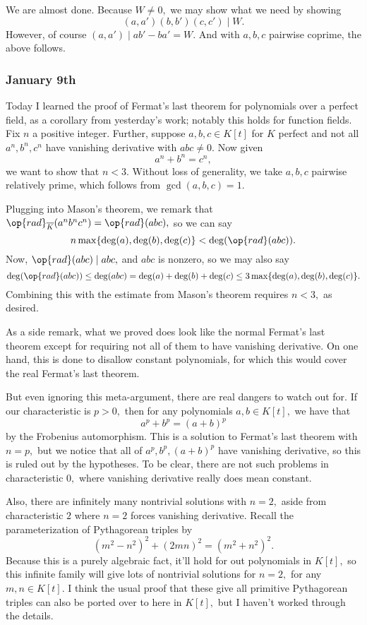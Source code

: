 We are almost done. Because $W\ne0,$ we may show what we need by showing
\[(a,a')(b,b')(c,c')\mid W.\]
However, of course $(a,a')\mid ab'-ba'=W.$ And with $a,b,c$ pairwise coprime, the above follows.

\subsubsection{January 9th}
Today I learned the proof of Fermat's last theorem for polynomials over a perfect field, as a corollary from yesterday's work; notably this holds for function fields. Fix $n$ a positive integer. Further, suppose $a,b,c\in K[t]$ for $K$ perfect and not all $a^n,b^n,c^n$ have vanishing derivative with $abc\ne0.$ Now given
\[a^n+b^n=c^n,\]
we want to show that $n<3.$ Without loss of generality, we take $a,b,c$ pairwise relatively prime, which follows from $\gcd(a,b,c)=1.$

Plugging into Mason's theorem, we remark that $\op{rad}_{\overline K}(a^nb^nc^n)=\op{rad}(abc),$ so we can say
\[n\max\{\deg(a),\deg(b),\deg(c)\}<\deg(\op{rad}(abc)).\]
Now, $\op{rad}(abc)\mid abc,$ and $abc$ is nonzero, so we may also say
\[\deg(\op{rad}(abc))\le\deg(abc)=\deg(a)+\deg(b)+\deg(c)\le3\max\{\deg(a),\deg(b),\deg(c)\}.\]
Combining this with the estimate from Mason's theorem requires $n<3,$ as desired.

As a side remark, what we proved does look like the normal Fermat's last theorem except for requiring not all of them to have vanishing derivative. On one hand, this is done to disallow constant polynomials, for which this would cover the real Fermat's last theorem.

But even ignoring this meta-argument, there are real dangers to watch out for. If our characteristic is $p>0,$ then for any polynomials $a,b\in K[t],$ we have that
\[a^p+b^p=(a+b)^p\]
by the Frobenius automorphism. This is a solution to Fermat's last theorem with $n=p,$ but we notice that all of $a^p,b^p,(a+b)^p$ have vanishing derivative, so this is ruled out by the hypotheses. To be clear, there are not such problems in characteristic $0,$ where vanishing derivative really does mean constant.

Also, there are infinitely many nontrivial solutions with $n=2,$ aside from characteristic $2$ where $n=2$ forces vanishing derivative. Recall the parameterization of Pythagorean triples by
\[\left(m^2-n^2\right)^2+(2mn)^2=\left(m^2+n^2\right)^2.\]
Because this is a purely algebraic fact, it'll hold for out polynomials in $K[t],$ so this infinite family will give lots of nontrivial solutions for $n=2,$ for any $m,n\in K[t].$ I think the usual proof that these give all primitive Pythagorean triples can also be ported over to here in $K[t],$ but I haven't worked through the details.

